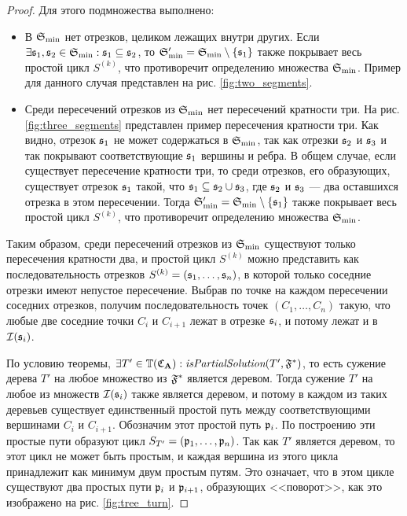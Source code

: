 \begin{proof}
Для этого подмножества выполнено:
\begin{itemize}
\item В $\mathfrak{S}_{\min}$ нет отрезков, целиком лежащих внутри других. Если $\exists \mathfrak{s}_1, \mathfrak{s}_2 \in \mathfrak{S}_{\min}: \mathfrak{s}_1 \subseteq \mathfrak{s}_2$, то $\mathfrak{S}'_{\min} = \mathfrak{S}_{\min} \setminus \{\mathfrak{s}_1\}$ также покрывает весь простой цикл $S^{(k)}$, что противоречит определению множества $\mathfrak{S}_{\min}$. Пример для данного случая представлен на рис. \ref{fig:two_segments}.
\item Среди пересечений отрезков из $\mathfrak{S}_{\min}$ нет пересечений кратности три. На рис. \ref{fig:three_segments} представлен пример пересечения кратности три. Как видно, отрезок $\mathfrak{s}_1$ не может содержаться в $\mathfrak{S}_{\min}$, так как отрезки $\mathfrak{s}_2$ и $\mathfrak{s}_3$ и так покрывают соответствующие $\mathfrak{s}_1$ вершины и ребра. В общем случае, если существует пересечение кратности три, то среди отрезков, его образующих, существует отрезок $\mathfrak{s}_1$ такой, что $\mathfrak{s}_1 \subseteq \mathfrak{s}_2 \cup \mathfrak{s}_3$, где $\mathfrak{s}_2$ и $\mathfrak{s}_3$ --- два оставшихся отрезка в этом пересечении. Тогда $\mathfrak{S}'_{\min} = \mathfrak{S}_{\min} \setminus \{\mathfrak{s}_1\}$ также покрывает весь простой цикл $S^{(k)}$, что противоречит определению множества $\mathfrak{S}_{\min}$.
\end{itemize}

Таким образом, среди пересечений отрезков из $\mathfrak{S}_{\min}$ существуют только пересечения кратности два, и простой цикл $S^{(k)}$ можно представить как последовательность отрезков $S^{(k)} = (\mathfrak{s}_1, \ldots, \mathfrak{s}_n)$, в которой только соседние отрезки имеют непустое пересечение. Выбрав по точке на каждом пересечении соседних отрезков, получим последовательность точек $(C_1, \ldots, C_n)$ такую, что любые две соседние точки $C_i$ и $C_{i + 1}$ лежат в отрезке $\mathfrak{s}_i$, и потому лежат и в $\mathcal{I}(\mathfrak{s}_i)$.

По условию теоремы, $\exists T' \in \mathbb{T}(\mathfrak{C}_{\mathbf{A}}): \textit{isPartialSolution}(T', \mathfrak{F}^*)$, то есть сужение дерева $T'$ на любое множество из $\mathfrak{F}^*$ является деревом. Тогда сужение $T'$ на любое из множеств $\mathcal{I}(\mathfrak{s}_i)$ также является деревом, и потому в каждом из таких деревьев существует единственный простой путь между соответствующими вершинами $C_i$ и $C_{i + 1}$. Обозначим этот простой путь $\mathfrak{p}_i$. По построению эти простые пути образуют цикл $S_{T'} = (\mathfrak{p}_1, \ldots, \mathfrak{p}_n)$. Так как $T'$ является деревом, то этот цикл не может быть простым, и каждая вершина из этого цикла принадлежит как минимум двум простым путям. Это означает, что в этом цикле существуют два простых пути $\mathfrak{p}_i$ и $\mathfrak{p}_{i+1}$, образующих <<поворот>>, как это изображено на рис. \ref{fig:tree_turn}.


\end{proof}
